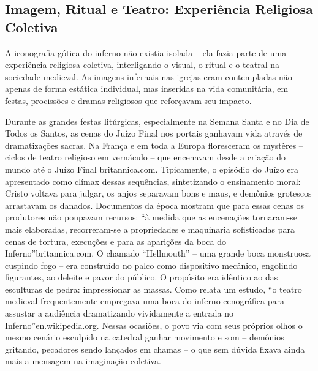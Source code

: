 \subsection{Imagem, Ritual e Teatro: Experiência Religiosa Coletiva}

A iconografia gótica do inferno não existia isolada -- ela fazia parte de uma experiência religiosa coletiva, interligando o visual, o ritual e o teatral na sociedade medieval. As imagens infernais nas igrejas eram contempladas não apenas de forma estática individual, mas inseridas na vida comunitária, em festas, procissões e dramas religiosos que reforçavam seu impacto.

Durante as grandes festas litúrgicas, especialmente na Semana Santa e no Dia de Todos os Santos, as cenas do Juízo Final nos portais ganhavam vida através de dramatizações sacras. Na França e em toda a Europa floresceram os mystères -- ciclos de teatro religioso em vernáculo -- que encenavam desde a criação do mundo até o Juízo Final britannica.com. Tipicamente, o episódio do Juízo era apresentado como clímax dessas sequências, sintetizando o ensinamento moral: Cristo voltava para julgar, os anjos separavam bons e maus, e demônios grotescos arrastavam os danados. Documentos da época mostram que para essas cenas os produtores não poupavam recursos: “à medida que as encenações tornaram-se mais elaboradas, recorreram-se a propriedades e maquinaria sofisticadas para cenas de tortura, execuções e para as aparições da boca do Inferno”britannica.com. O chamado “Hellmouth” -- uma grande boca monstruosa cuspindo fogo -- era construído no palco como dispositivo mecânico, engolindo figurantes, ao deleite e pavor do público. O propósito era idêntico ao das esculturas de pedra: impressionar as massas. Como relata um estudo, “o teatro medieval frequentemente empregava uma boca-do-inferno cenográfica para assustar a audiência dramatizando vividamente a entrada no Inferno”en.wikipedia.org. Nessas ocasiões, o povo via com seus próprios olhos o mesmo cenário esculpido na catedral ganhar movimento e som -- demônios gritando, pecadores sendo lançados em chamas -- o que sem dúvida fixava ainda mais a mensagem na imaginação coletiva.

